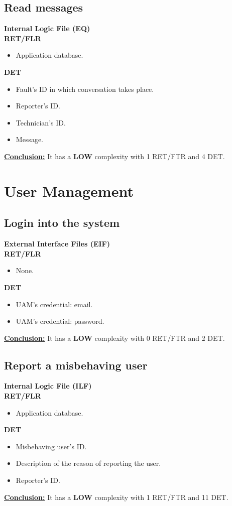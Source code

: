 \subsection{Read messages}
\textbf{Internal Logic File (EQ)} \\ 
\textbf{RET/FLR}
\begin{itemize}
\item Application database.
\end{itemize}
\textbf{DET}
\begin{itemize}
\item Fault's ID in which conversation takes place.
\item Reporter's ID.
\item Technician's ID.
\item Message.
\end{itemize}
\textbf{\underline{Conclusion:}} It has a \textbf{LOW} complexity with 1 RET/FTR and 4 DET.



\section{User Management}

\subsection{Login into the system}
\textbf{External Interface Files (EIF)} \\ 
\textbf{RET/FLR}
\begin{itemize}
\item None.
\end{itemize}
\textbf{DET}
\begin{itemize}
\item UAM's credential: email.
\item UAM's credential: password.
\end{itemize}
\textbf{\underline{Conclusion:}} It has a \textbf{LOW} complexity with 0 RET/FTR and 2 DET.

\subsection{Report a misbehaving user}
\textbf{Internal Logic File (ILF)} \\ 
\textbf{RET/FLR}
\begin{itemize}
\item Application database.

\end{itemize}
\textbf{DET}
\begin{itemize}
\item Misbehaving user's ID.
\item Description of the reason of reporting the user.
\item Reporter's ID.

\end{itemize}
\textbf{\underline{Conclusion:}} It has a \textbf{LOW} complexity with 1 RET/FTR and 11 DET.


